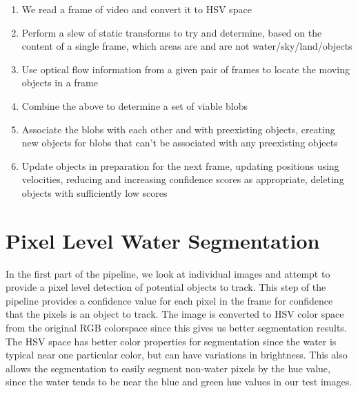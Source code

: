 \documentclass{article}
\begin{document}
\begin{enumerate}
\item We read a frame of video and convert it to HSV space
\item Perform a slew of static transforms to try and determine,
      based on the content of a single frame, which areas are and
      are not water/sky/land/objects
\item Use optical flow information from a given pair of frames to
      locate the moving objects in a frame
\item Combine the above to determine a set of viable blobs
\item Associate the blobs with each other and with preexisting objects,
      creating new objects for blobs that can't be associated with any
      preexisting objects
\item Update objects in preparation for the next frame, updating
      positions using velocities, reducing and increasing confidence
      scores as appropriate, deleting objects with sufficiently low
      scores
\end{enumerate}

\section{Pixel Level Water Segmentation}
In the first part of the pipeline, we look at individual images and attempt to provide a pixel level detection of potential objects to track.  This step of the pipeline provides a confidence value for each pixel in the frame for confidence that the pixels is an object to track.
The image is converted to HSV color space from the original RGB colorspace since this gives us better segmentation results. The HSV space has better color properties for segmentation since the water is typical near one particular color, but can have variations in brightness.  This also allows the segmentation to easily segment non-water pixels by the hue value, since the water tends to be near the blue and green hue values in our test images.
\end{document}
